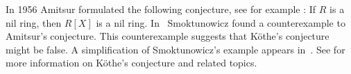 In 1956 Amitsur formulated the following conjecture, see for example
\cite{MR0347873}: If $R$ is a nil ring, then $R[X]$ is a nil ring. In~\cite{MR1793911} 
Smoktunowicz found a counterexample to Amitsur's conjecture. 
This counterexample suggests that K\"othe's conjecture might be false. 
A simplification of Smoktunowicz's example
appears in~\cite{MR3169522}. See \cite{MR1879880,MR2275597} for more
information on K\"othe's conjecture and related topics. 


 

